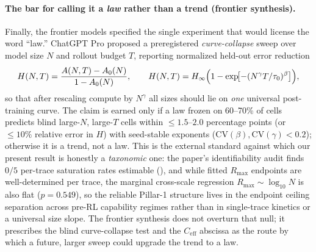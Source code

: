 \paragraph{The bar for calling it a \emph{law} rather than a trend (frontier synthesis).}
Finally, the frontier models specified the single experiment that would
license the word ``law.'' ChatGPT Pro proposed a preregistered
\emph{curve-collapse} sweep over model size $N$ and rollout budget $T$,
reporting normalized held-out error reduction
\begin{equation}
  \label{eq:frontier-collapse}
  H(N,T) = \frac{A(N,T) - A_0(N)}{1 - A_0(N)},
  \qquad
  H(N,T) = H_\infty\Bigl(1 - \exp\!\bigl[-(N^{\gamma} T / \tau_0)^{\beta}\bigr]\Bigr),
\end{equation}
so that after rescaling compute by $N^{\gamma}$ all sizes should lie on
\emph{one} universal post-training curve. The claim is earned only if a law
frozen on 60--70\% of cells predicts blind large-$N$, large-$T$ cells within
$\le 1.5$--$2.0$ percentage points (or $\le 10\%$ relative error in $H$) with
seed-stable exponents ($\mathrm{CV}(\beta),\mathrm{CV}(\gamma)<0.2$);
otherwise it is a trend, not a law. This is the external standard against
which our present result is honestly a \emph{taxonomic} one: the paper's
identifiability audit finds $0/5$ per-trace saturation rates estimable
(), and while fitted $R_{\max}$ endpoints are well-determined per trace, the marginal cross-scale regression $R_{\max}\sim\log_{10}N$ is also flat ($p = 0.549$), so the reliable Pillar-1 structure lives in the endpoint ceiling separation across pre-RL capability regimes rather than in single-trace kinetics or a universal size slope. The frontier synthesis does not overturn that null; it
prescribes the blind curve-collapse test and the $C_{\mathrm{eff}}$ abscissa
as the route by which a future, larger sweep could upgrade the trend to a law.
